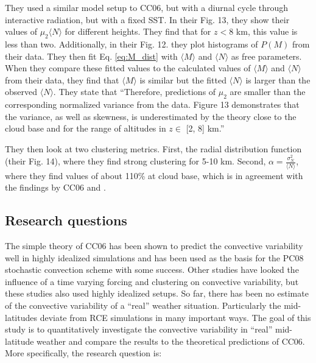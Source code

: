 \documentclass[a4paper, 12pt]{article}
\begin{document}
\subsubsection{\cite{Davoudi2010}}
They used a similar model setup to CC06, but with a diurnal cycle through interactive radiation, but with a fixed SST. In their Fig. 13, they show their values of $\mu_2 \langle N \rangle$ for different heights. They find that for $z <$8 km, this value is less than two. Additionally, in their Fig. 12. they plot histograms of $P(M)$ from their data. They then fit Eq. \ref{eq:M_dist} with $\langle M \rangle$ and $\langle N \rangle$ as free parameters. When they compare these fitted values to the calculated values of $\langle M \rangle$ and $\langle N \rangle$ from their data, they find that $\langle M \rangle$  is similar but the fitted $\langle N \rangle$ is larger than the observed $\langle N \rangle$. They state that ``Therefore, predictions of $\mu_2$ are smaller than the corresponding normalized variance from the data. Figure 13 demonstrates that the variance, as well as skewness, is underestimated by the theory close to the cloud base and for the range of altitudes in $z \in$  [2, 8] km.''

They then look at two clustering metrics. First, the radial distribution function (their Fig. 14), where they find strong clustering for 5-10 km. Second, $\alpha = \frac{\sigma_N^2}{\langle N \rangle}$, where they find values of about 110\% at cloud base, which is in agreement with the findings by CC06 and \cite{Davies2008}. 

\subsection{Research questions}
The simple theory of CC06 has been shown to predict the convective variability well in highly idealized simulations and has been used as the basis for the PC08 stochastic convection scheme with some success. Other studies have looked the influence of a time varying forcing and clustering on convective variability, but these studies also used highly idealized setups. So far, there has been no estimate of the convective variability of a ``real'' weather situation. Particularly the mid-latitudes deviate from RCE simulations in many important ways. The goal of this study is to quantitatively investigate the convective variability in ``real'' mid-latitude weather and compare the results to the theoretical predictions of CC06. More specifically, the research question is:
\end{document}
